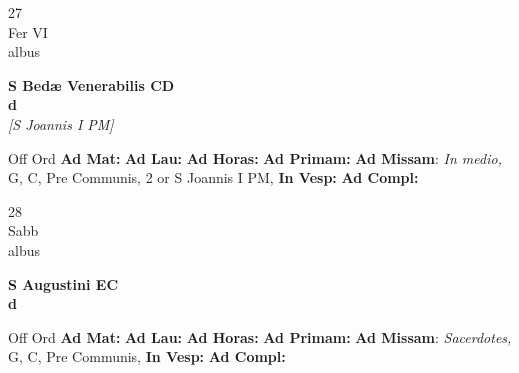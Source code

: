 \documentclass[10pt, openany]{book}
\begin{document}
    \begin{center}
        \begin{minipage}{3.5in}
            \vspace{2em}
            \begin{minipage}{0.5in}
                {\Huge 27} \\
                {\normalsize Fer VI} \\
                {\normalsize albus}
            \end{minipage}
            \begin{minipage}{3.0in}
                \textbf{ \large S Bedæ Venerabilis CD \\
                \textnormal{\normalsize d}} \\ \textit{[S Joannis I PM]} \\ 
            \end{minipage}
            \begin{justify}Off Ord
                \textbf{Ad Mat: }
                \textbf{Ad Lau: }
                \textbf{Ad Horas: }
                \textbf{Ad Primam: }\textbf{Ad Missam}: \textit{In medio,} G, C, Pre Communis, 2 or S Joannis I PM,  
                \textbf{In Vesp: }
                \textbf{Ad Compl: }
            \end{justify}
        \end{minipage}
    \end{center}

    \begin{center}
        \begin{minipage}{3.5in}
            \vspace{2em}
            \begin{minipage}{0.5in}
                {\Huge 28} \\
                {\normalsize Sabb} \\
                {\normalsize albus}
            \end{minipage}
            \begin{minipage}{3.0in}
                \textbf{ \large S Augustini EC \\
                \textnormal{\normalsize d}} \\ 
            \end{minipage}
            \begin{justify}Off Ord
                \textbf{Ad Mat: }
                \textbf{Ad Lau: }
                \textbf{Ad Horas: }
                \textbf{Ad Primam: }\textbf{Ad Missam}: \textit{Sacerdotes,} G, C, Pre Communis,  
                \textbf{In Vesp: }
                \textbf{Ad Compl: }
            \end{justify}
        \end{minipage}
    \end{center}
\end{document}
